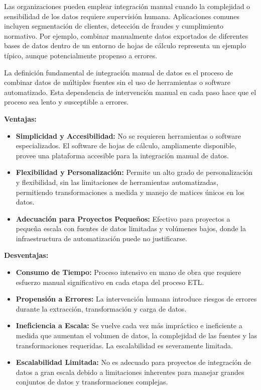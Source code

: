 \documentclass[12pt]{book}
\begin{document}
Las organizaciones pueden emplear integración manual cuando la complejidad o sensibilidad de los datos requiere supervisión humana. Aplicaciones comunes incluyen segmentación de clientes, detección de fraudes y cumplimiento normativo. Por ejemplo, combinar manualmente datos exportados de diferentes bases de datos dentro de un entorno de hojas de cálculo representa un ejemplo típico, aunque potencialmente propenso a errores.

La definición fundamental de integración manual de datos es el proceso de combinar datos de múltiples fuentes sin el uso de herramientas o software automatizado. Esta dependencia de intervención manual en cada paso hace que el proceso sea lento y susceptible a errores.

\textbf{Ventajas:}

\begin{itemize}
    \item \textbf{Simplicidad y Accesibilidad:} No se requieren herramientas o software especializados. El software de hojas de cálculo, ampliamente disponible, provee una plataforma accesible para la integración manual de datos.
    \item \textbf{Flexibilidad y Personalización:} Permite un alto grado de personalización y flexibilidad, sin las limitaciones de herramientas automatizadas, permitiendo transformaciones a medida y manejo de matices únicos en los datos.
    \item \textbf{Adecuación para Proyectos Pequeños:} Efectivo para proyectos a pequeña escala con fuentes de datos limitadas y volúmenes bajos, donde la infraestructura de automatización puede no justificarse.
\end{itemize}

\textbf{Desventajas:}

\begin{itemize}
    \item \textbf{Consumo de Tiempo:} Proceso intensivo en mano de obra que requiere esfuerzo manual significativo en cada etapa del proceso ETL.
    \item \textbf{Propensión a Errores:} La intervención humana introduce riesgos de errores durante la extracción, transformación y carga de datos.
    \item \textbf{Ineficiencia a Escala:} Se vuelve cada vez más impráctico e ineficiente a medida que aumentan el volumen de datos, la complejidad de las fuentes y las transformaciones requeridas. La escalabilidad es severamente limitada.
    \item \textbf{Escalabilidad Limitada:} No es adecuado para proyectos de integración de datos a gran escala debido a limitaciones inherentes para manejar grandes conjuntos de datos y transformaciones complejas.
\end{itemize}
\end{document}
